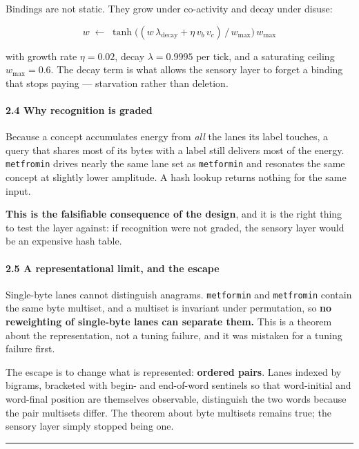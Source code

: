 \documentclass[
  11pt,
  a4paper,
]{article}
\begin{document}
Bindings are not static. They grow under co-activity and decay under
disuse:

\[
w \;\leftarrow\; \tanh\big( (w\,\lambda_{\text{decay}} + \eta\, v_b\, v_c)
\,/\, w_{\max} \big)\, w_{\max}
\]

with growth rate \(\eta = 0.02\), decay \(\lambda = 0.9995\) per tick,
and a saturating ceiling \(w_{\max} = 0.6\). The decay term is what
allows the sensory layer to forget a binding that stops paying ---
starvation rather than deletion.

\paragraph{2.4 Why recognition is
graded}\label{why-recognition-is-graded}

Because a concept accumulates energy from \emph{all} the lanes its label
touches, a query that shares most of its bytes with a label still
delivers most of the energy. \texttt{metfromin} drives nearly the same
lane set as \texttt{metformin} and resonates the same concept at
slightly lower amplitude. A hash lookup returns nothing for the same
input.

\textbf{This is the falsifiable consequence of the design}, and it is
the right thing to test the layer against: if recognition were not
graded, the sensory layer would be an expensive hash table.

\paragraph{2.5 A representational limit, and the
escape}\label{a-representational-limit-and-the-escape}

Single-byte lanes cannot distinguish anagrams. \texttt{metformin} and
\texttt{metfromin} contain the same byte multiset, and a multiset is
invariant under permutation, so \textbf{no reweighting of single-byte
lanes can separate them.} This is a theorem about the representation,
not a tuning failure, and it was mistaken for a tuning failure first.

The escape is to change what is represented: \textbf{ordered pairs}.
Lanes indexed by bigrams, bracketed with begin- and end-of-word
sentinels so that word-initial and word-final position are themselves
observable, distinguish the two words because the pair multisets differ.
The theorem about byte multisets remains true; the sensory layer simply
stopped being one.

\begin{center}\rule{0.5\linewidth}{0.5pt}\end{center}
\end{document}
